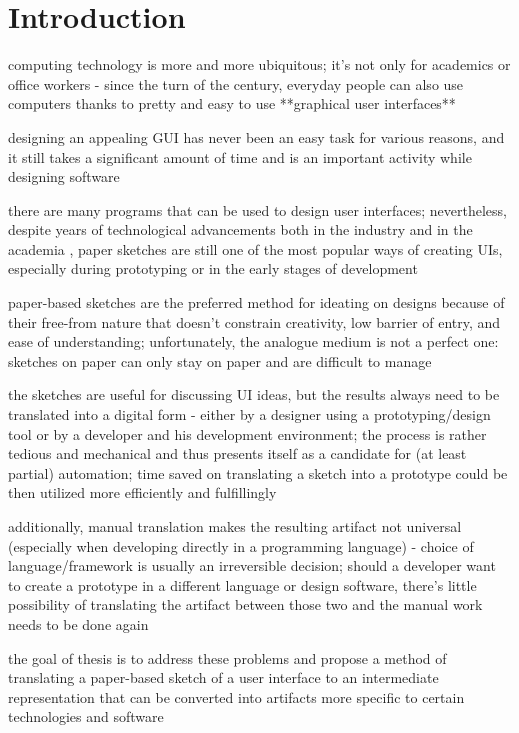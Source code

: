 \section{Introduction}\label{sec:introduction}


computing technology is more and more ubiquitous; it's not only for academics
or office workers - since the turn of the century, everyday people can also use
computers thanks to pretty and easy to use
**graphical user interfaces** 

designing an appealing GUI has never been an easy task for various reasons,
and it still takes a significant amount of time 
and is an important activity while designing software

there are many programs that can be used to design user interfaces;
nevertheless, despite years of technological advancements
both in the industry and in the academia , paper sketches are still
one of the most popular  ways of creating UIs, especially during prototyping
or in the early stages of development

paper-based sketches are the preferred method for ideating on designs
because of their free-from nature that doesn't constrain creativity,
low barrier of entry, and ease of understanding;
unfortunately, the analogue medium is not a perfect one: sketches on paper
can only stay on paper and are difficult to manage 

the sketches are useful for discussing UI ideas, but the results
always need to be translated into a digital form - either by a designer using a prototyping/design tool or by a developer and his development environment;
the process is rather tedious and mechanical  and thus presents itself
as a candidate for (at least partial) automation;
time saved on translating a sketch into a prototype
could be then utilized more efficiently and fulfillingly

additionally, manual translation makes the resulting artifact not universal
(especially when developing directly in a programming language)
- choice of language/framework is usually an irreversible decision;
should a developer want to create a prototype in a different language
or design software, there's little possibility of translating the artifact
between those two and the manual work needs to be done again

the goal of thesis is to address these problems and propose a method
of translating a paper-based sketch of a user interface
to an intermediate representation that can be converted into artifacts
more specific to certain technologies and software

